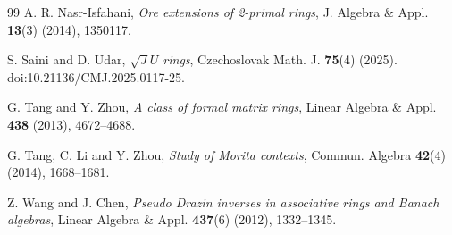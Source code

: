 \documentclass[12pt]{amsart}
\theoremstyle{definition}
\begin{document}
\begin{thebibliography}{99}
A. R. Nasr-Isfahani, {\it Ore extensions of 2-primal rings}, J. Algebra \& Appl. {\bf 13}(3) (2014), 1350117.

S. Saini and D. Udar, {\it $\sqrt{J}U$ rings}, Czechoslovak Math. J. {\bf 75}(4) (2025). doi:10.21136/CMJ.2025.0117-25.

G. Tang and Y. Zhou, {\it A class of formal matrix rings}, Linear Algebra \& Appl. {\bf 438} (2013), 4672--4688.

G. Tang, C. Li and Y. Zhou, {\it Study of Morita contexts}, Commun. Algebra {\bf 42}(4) (2014), 1668--1681.

Z. Wang and J. Chen, {\it Pseudo Drazin inverses in associative rings and Banach algebras}, Linear Algebra \& Appl. {\bf 437}(6) (2012), 1332--1345.

\end{thebibliography}
\end{document}
